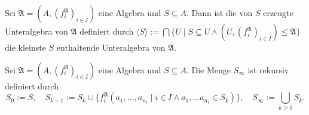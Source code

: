 \begin{corollary}
    Sei $\mathfrak{A}=(A,(f^\mathfrak{A}_i)_{i\in I})$ eine Algebra und $S\subseteq A$. Dann ist die von $S$ erzeugte Unteralgebra von 
    $\mathfrak{A}$ definiert durch $\langle S\rangle:=\bigcap\{U \mid S\subseteq U\land (U,(f^\mathfrak{A}_i)_{i\in I})\le \mathfrak{A}\}$
    die kleinste $S$ enthaltende Unteralgebra von $\mathfrak{A}$.
\end{corollary}

\begin{definition}
    Sei $\mathfrak{A}=(A,(f^\mathfrak{A}_i)_{i\in I})$ eine Algebra und $S\subseteq A$. Die Menge $S_\infty$ ist rekursiv
    definiert durch
    \[S_0:=S, \quad S_{k+1}:=S_k\cup\{f^\mathfrak{A}_i(a_1,\ldots,a_{n_i} \mid i\in I\land a_1,\ldots a_{n_i}\in S_k)\},\quad S_\infty:=\bigcup_{k\geq 0}S_k.\]
\end{definition}

